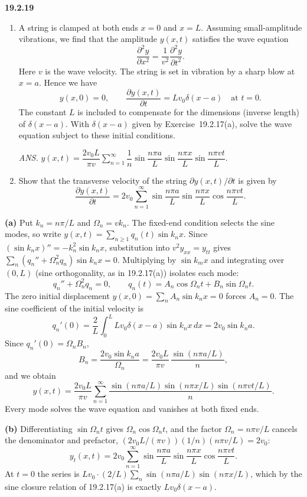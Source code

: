 \par\bigskip
\noindent\textbf{19.2.19}
\begin{enumerate}
\item[(a)] A string is clamped at both ends $x=0$ and $x=L$.
Assuming small-amplitude vibrations, we find that the amplitude
$y(x,t)$ satisfies the wave equation
\[
\frac{\partial^{2}y}{\partial x^{2}}
=\frac{1}{v^{2}}\frac{\partial^{2}y}{\partial t^{2}}.
\]
Here $v$ is the wave velocity. The string is set in vibration by a
sharp blow at $x=a$. Hence we have
\[
y(x,0)=0,\qquad\frac{\partial y(x,t)}{\partial t}
=Lv_{0}\delta(x-a)\quad\text{at }t=0.
\]
The constant $L$ is included to compensate for the dimensions
(inverse length) of $\delta(x-a)$. With $\delta(x-a)$ given by
Exercise~19.2.17(a), solve the wave equation subject to these
initial conditions.
\par\nobreak\hfill\emph{ANS.}\enspace
$y(x,t)=\dfrac{2v_{0}L}{\pi v}\displaystyle\sum_{n=1}^{\infty}
\dfrac{1}{n}\sin\dfrac{n\pi a}{L}\sin\dfrac{n\pi x}{L}
\sin\dfrac{n\pi vt}{L}$.
\item[(b)] Show that the transverse velocity of the string
$\partial y(x,t)/\partial t$ is given by
\[
\frac{\partial y(x,t)}{\partial t}
=2v_{0}\sum_{n=1}^{\infty}\sin\frac{n\pi a}{L}
\sin\frac{n\pi x}{L}\cos\frac{n\pi vt}{L}.
\]
\end{enumerate}
\solution
\textbf{(a)} Put $k_n=n\pi/L$ and $\Omega_n=vk_n$.
The fixed-end condition selects the sine modes, so write
$y(x,t)=\sum_{n\ge1}q_n(t)\sin k_nx$. Since
$(\sin k_nx)''=-k_n^2\sin k_nx$, substitution into $v^2y_{xx}=y_{tt}$
gives $\sum_n(q_n''+\Omega_n^2q_n)\sin k_nx=0$. Multiplying by
$\sin k_mx$ and integrating over $(0,L)$ (sine orthogonality, as in
19.2.17(a)) isolates each mode:
\[
q_n''+\Omega_n^2q_n=0,
\qquad q_n(t)=A_n\cos\Omega_nt+B_n\sin\Omega_nt.
\]
The zero initial displacement $y(x,0)=\sum_nA_n\sin k_nx=0$ forces
$A_n=0$. The sine coefficient of the initial velocity is
\[
q_n'(0)=\frac2L\int_0^L Lv_0\delta(x-a)\sin k_nx\,dx
=2v_0\sin k_na.
\]
Since $q_n'(0)=\Omega_nB_n$,
\[
B_n=\frac{2v_0\sin k_na}{\Omega_n}
=\frac{2v_0L}{\pi v}\,\frac{\sin(n\pi a/L)}{n},
\]
and we obtain
\[
\boxed{y(x,t)=\frac{2v_0L}{\pi v}\sum_{n=1}^{\infty}
\frac{\sin(n\pi a/L)\sin(n\pi x/L)\sin(n\pi vt/L)}n.}
\]
Every mode solves the wave equation and vanishes at both fixed ends.

\textbf{(b)} Differentiating $\sin\Omega_nt$ gives
$\Omega_n\cos\Omega_nt$, and the factor $\Omega_n=n\pi v/L$ cancels the
denominator and prefactor,
$(2v_0L/(\pi v))(1/n)(n\pi v/L)=2v_0$:
\[
\boxed{y_t(x,t)=2v_0\sum_{n=1}^{\infty}
\sin\frac{n\pi a}{L}\sin\frac{n\pi x}{L}
\cos\frac{n\pi vt}{L}.}
\]
At $t=0$ the series is
$Lv_0\cdot(2/L)\sum_n\sin(n\pi a/L)\sin(n\pi x/L)$, which by the sine
closure relation of 19.2.17(a) is exactly $Lv_0\delta(x-a)$.

